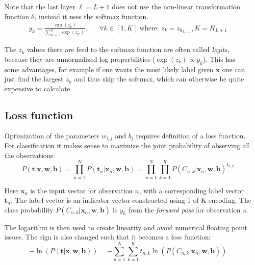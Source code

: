 Note that the last layer $\ell = L + 1$ does not use the non-linear transformation function $\theta$, instead it uses the softmax function.
\begin{equation}
\begin{aligned}
y_k = \frac{\exp(z_k)}{\sum_{k'=1}^K \exp(z_{k'})}, && \forall k \in [1, K] \text{ where: } z_k=z_{h_{L+1}}, K = H_{L + 1}
\end{aligned}
\label{eq:theory:ffnn:y}
\end{equation}

The $z_k$ values there are feed to the softmax function are often called \textit{logits}, because they are unnormalized log properbilities ($\exp(z_k) \propto y_k$). This has some advantages, for example if one wants the most likely label given $\mathbf{x}$ one can just find the largest $z_k$ and thus skip the softmax, which can otherwise be quite expensive to calculate.

\subsection{Loss function}

Optimization of the parameters $w_{i,j}$ and $b_{j}$ requires definition of a loss function. For classification it makes sense to maximize the joint probability of observing all the observations:
\begin{equation}
P(\mathbf{t} | \mathbf{x}, \mathbf{w}, \mathbf{b}) = \prod_{n=1}^N P(\mathbf{t}_n | \mathbf{x}_n, \mathbf{w}, \mathbf{b})  = \prod_{n=1}^N \prod_{k=1}^K P(C_{n, k} | \mathbf{x}_n, \mathbf{w}, \mathbf{b})^{t_{n, k}}
\end{equation}

Here $\mathbf{x}_{n}$ is the input vector for observation $n$, with a corresponding label vector $\mathbf{t}_n$. The label vector is an indicator vector constructed using 1-of-K encoding. The class probability $P(C_{n, k} | \mathbf{x}_n, \mathbf{w}, \mathbf{b})$ is $y_k$ from the \textit{forward pass} for observation $n$.

The logarithm is then used to create linearity and avoid numerical floating point issues. The sign is also changed such that it becomes a loss function:
\begin{equation}
- \ln\left(P(\mathbf{t} | \mathbf{x}, \mathbf{w}, \mathbf{b})\right) = - \sum_{n=1}^N \sum_{k=1}^K t_{n, k} \ln\left( P(C_{n, k} | \mathbf{x}_n, \mathbf{w}, \mathbf{b})\right)
\label{eq:theory:ffnn:long-loss}
\end{equation}

